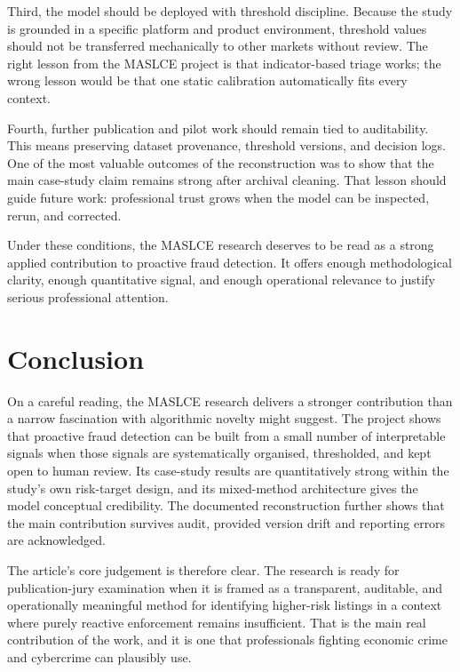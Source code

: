 \documentclass[11pt,a4paper]{article}
\begin{document}
Third, the model should be deployed with threshold discipline. Because the study is grounded in a specific platform and product environment, threshold values should not be transferred mechanically to other markets without review. The right lesson from the MASLCE project is that indicator-based triage works; the wrong lesson would be that one static calibration automatically fits every context.

Fourth, further publication and pilot work should remain tied to auditability. This means preserving dataset provenance, threshold versions, and decision logs. One of the most valuable outcomes of the reconstruction was to show that the main case-study claim remains strong after archival cleaning. That lesson should guide future work: professional trust grows when the model can be inspected, rerun, and corrected.

Under these conditions, the MASLCE research deserves to be read as a strong applied contribution to proactive fraud detection. It offers enough methodological clarity, enough quantitative signal, and enough operational relevance to justify serious professional attention.

\section{Conclusion}
On a careful reading, the MASLCE research delivers a stronger contribution than a narrow fascination with algorithmic novelty might suggest. The project shows that proactive fraud detection can be built from a small number of interpretable signals when those signals are systematically organised, thresholded, and kept open to human review. Its case-study results are quantitatively strong within the study's own risk-target design, and its mixed-method architecture gives the model conceptual credibility. The documented reconstruction further shows that the main contribution survives audit, provided version drift and reporting errors are acknowledged.

The article's core judgement is therefore clear. The research is ready for publication-jury examination when it is framed as a transparent, auditable, and operationally meaningful method for identifying higher-risk listings in a context where purely reactive enforcement remains insufficient. That is the main real contribution of the work, and it is one that professionals fighting economic crime and cybercrime can plausibly use.

{\newpage}
\end{document}
